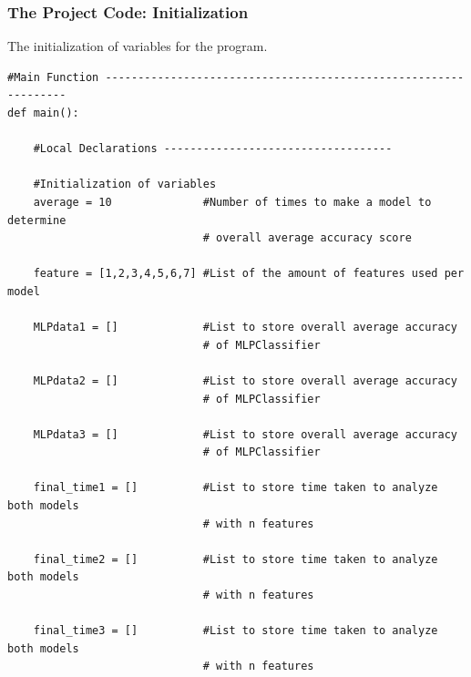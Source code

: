 \documentclass{beamer}
\begin{document}
\begin{frame}[fragile]
\frametitle{The Project Code: Initialization}

\fontsize{6}{5}
The initialization of variables for the program.
\begin{verbatim}
#Main Function ----------------------------------------------------------------
def main():

    #Local Declarations -----------------------------------

    #Initialization of variables
    average = 10              #Number of times to make a model to determine
                              # overall average accuracy score

    feature = [1,2,3,4,5,6,7] #List of the amount of features used per model

    MLPdata1 = []             #List to store overall average accuracy
                              # of MLPClassifier

    MLPdata2 = []             #List to store overall average accuracy
                              # of MLPClassifier

    MLPdata3 = []             #List to store overall average accuracy
                              # of MLPClassifier

    final_time1 = []          #List to store time taken to analyze both models
                              # with n features

    final_time2 = []          #List to store time taken to analyze both models
                              # with n features

    final_time3 = []          #List to store time taken to analyze both models
                              # with n features

\end{verbatim}

\end{frame}

\end{document}
